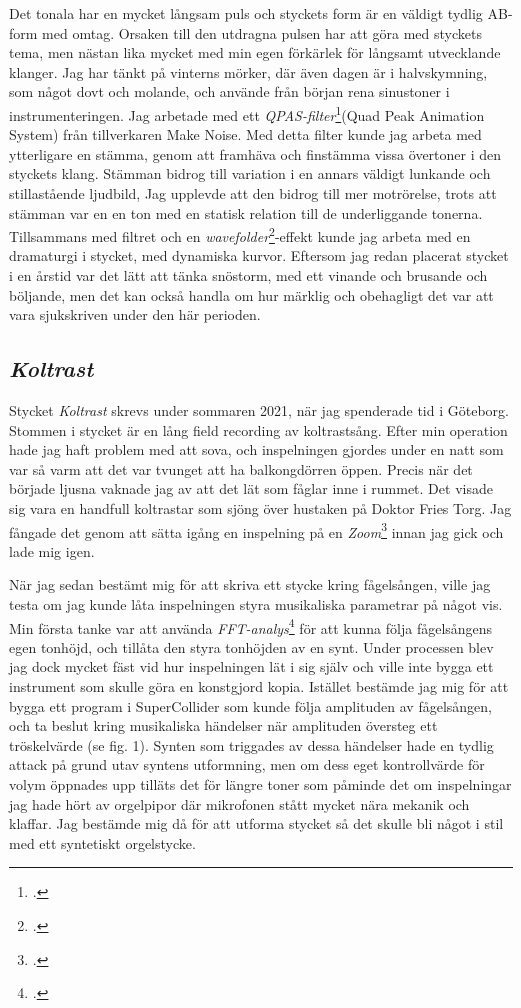 \documentclass{article}
\begin{document}
Det tonala har en mycket långsam puls och styckets form är en väldigt tydlig AB-form med omtag. Orsaken till
den utdragna pulsen har att göra med styckets tema, men nästan lika mycket med min egen förkärlek för långsamt
utvecklande klanger. Jag har tänkt på vinterns mörker, där även dagen är i halvskymning, som något dovt och
molande, och använde från början rena sinustoner i instrumenteringen. Jag arbetade med ett
\emph{QPAS-filter}\footcite{qpas}(Quad Peak Animation System) från
tillverkaren Make Noise. Med detta filter kunde jag arbeta med ytterligare en stämma, genom att framhäva och
finstämma vissa övertoner i den styckets klang. Stämman bidrog till variation i en annars väldigt lunkande och
stillastående ljudbild, Jag upplevde att den bidrog till mer motrörelse, trots att stämman var en en ton med
en statisk relation till de underliggande tonerna. Tillsammans med filtret och en
\emph{wavefolder}\footcite{wavefolder}-effekt kunde jag arbeta med en dramaturgi i
stycket, med dynamiska kurvor. Eftersom jag redan placerat stycket i en årstid var det lätt att tänka
snöstorm, med ett vinande och brusande och böljande, men det kan också handla om hur märklig och obehagligt
det var att vara sjukskriven under den här perioden.


\subsection{\emph{Koltrast}}\nocite{KOLTRAST}
Stycket \emph{Koltrast} skrevs under sommaren 2021, när jag spenderade tid i Göteborg. Stommen i stycket är en
lång field recording av koltrastsång. Efter min operation hade jag haft problem med att sova, och inspelningen
gjordes under en natt som var så varm att det var tvunget att ha balkongdörren öppen. Precis när det började
ljusna vaknade jag av att det lät som fåglar inne i rummet. Det visade sig vara en handfull koltrastar som
sjöng över hustaken på Doktor Fries Torg. Jag fångade det genom att sätta igång en inspelning på en  
\emph{Zoom}\footcite{zoom} innan
jag gick och lade mig igen. 

När jag sedan bestämt mig för att skriva ett stycke kring fågelsången, ville jag
testa om jag kunde låta inspelningen styra musikaliska parametrar på något vis. Min första tanke var att
använda \emph{FFT-analys}\footcite[189-199]{audioFX} för att kunna följa	
fågelsångens egen tonhöjd, och tillåta den styra tonhöjden av en synt. Under processen blev jag dock
mycket fäst vid hur inspelningen lät i sig själv och ville inte bygga ett instrument som skulle göra en
konstgjord kopia. Istället bestämde jag mig för att bygga ett program i SuperCollider som kunde följa
amplituden av fågelsången, och ta beslut kring musikaliska händelser när amplituden översteg ett tröskelvärde
(se fig. 1). Synten som triggades av dessa händelser hade en tydlig attack på grund utav syntens utformning,
men om dess eget kontrollvärde för volym öppnades upp tilläts det för längre toner som påminde det om
inspelningar jag hade hört av orgelpipor där mikrofonen stått mycket nära mekanik och klaffar. Jag bestämde
mig då för att utforma stycket så det skulle bli något i stil med ett syntetiskt orgelstycke.
\end{document}
